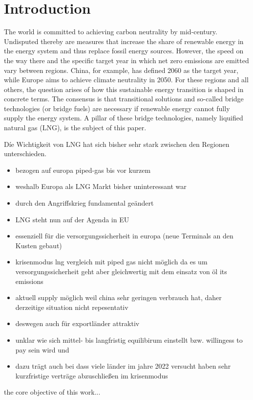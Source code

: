 \section{Introduction}
The world is committed to achieving carbon neutrality by mid-century. Undisputed thereby are measures that increase the share of renewable energy in the energy system and thus replace fossil energy sources. However, the speed on the way there and the specific target year in which net zero emissions are emitted vary between regions. China, for example, has defined 2060 as the target year, while Europe aims to achieve climate neutrality in 2050. For these regions and all others, the question arises of how this sustainable energy transition is shaped in concrete terms. The consensus is that transitional solutions and so-called bridge technologies (or bridge fuels) are necessary if renewable energy cannot fully supply the energy system. A pillar of these bridge technologies, namely liquified natural gas (LNG), is the subject of this paper.                

Díe Wichtigkeit von LNG hat sich bisher sehr stark zwischen den Regionen unterschieden. 



\begin{itemize}
	\item bezogen auf europa piped-gas bis vor kurzem
	\item weshalb Europa als LNG Markt bisher uninteressant war 
	\item durch den Angriffskrieg fundamental geändert 
	\item LNG steht nun auf der Agenda in EU
	\item essenziell für die versorgungssicherheit in europa (neue Terminals an den Kusten gebaut)
	\item krisenmodus lng vergleich mit piped gas nicht möglich da es um versorgungssicherheit geht aber gleichwertig mit dem einsatz von öl its emissions
	\item aktuell supply möglich weil china sehr geringen verbrauch hat, daher derzeitige situation nicht repesentativ 
	\item deswegen auch für exportländer attraktiv 
	\item unklar wie sich mittel- bis langfristig equilibirum einstellt bzw. willingess to pay sein wird und 
	\item dazu trägt auch bei dass viele länder im jahre 2022 versucht haben sehr kurzfristige verträge abzuschließen im krisenmodus 
\end{itemize}

the core objective of this work...